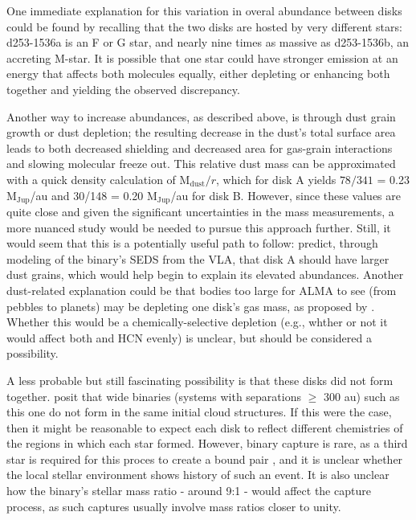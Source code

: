 One immediate explanation for this variation in overal abundance between disks could be found by recalling that the two disks are hosted by very different stars: d253-1536a is an F or G star, and nearly nine times as massive as d253-1536b, an accreting M-star. It is possible that one star could have stronger emission at an energy that affects both molecules equally, either depleting or enhancing both together and yielding the observed discrepancy.


Another way to increase abundances, as described above, is through dust grain growth or dust depletion; the resulting decrease in the dust's total surface area leads to both decreased shielding and decreased area for gas-grain interactions and slowing molecular freeze out. This relative dust mass can be approximated with a quick density calculation of M$_\text{dust}/r$, which for disk A yields $78/341$ = 0.23 M$_\text{Jup}$/au and 30/148 = 0.20 M$_\text{Jup}$/au for disk B. However, since these values are quite close and given the significant uncertainties in the mass measurements, a more nuanced study would be needed to pursue this approach further. Still, it would seem that this is a potentially useful path to follow: \citet{Ricci2011} predict, through modeling of the binary's SEDS from the VLA, that disk A should have larger dust grains, which would help begin to explain its elevated abundances. Another dust-related explanation could be that bodies too large for ALMA to see (from pebbles to planets) may be depleting one disk's gas mass, as proposed by \citet{Miotello2016}. Whether this would be a chemically-selective depletion (e.g., whther or not it would affect both \hco{} and HCN evenly) is unclear, but should be considered a possibility.


A less probable but still fascinating possibility is that these disks did not form together. \citet{Williams2014} posit that wide binaries (systems with separations $\geq$ 300 au) such as this one do not form in the same initial cloud structures. If this were the case, then it might be reasonable to expect each disk to reflect different chemistries of the regions in which each star formed. However, binary capture is rare, as a third star is required for this proces to create a bound pair \citep[e.g.][]{Mansbach1970}, and it is unclear whether the local stellar environment shows history of such an event. It is also unclear how the binary's stellar mass ratio - around 9:1 - would affect the capture process, as such captures usually involve mass ratios closer to unity.


